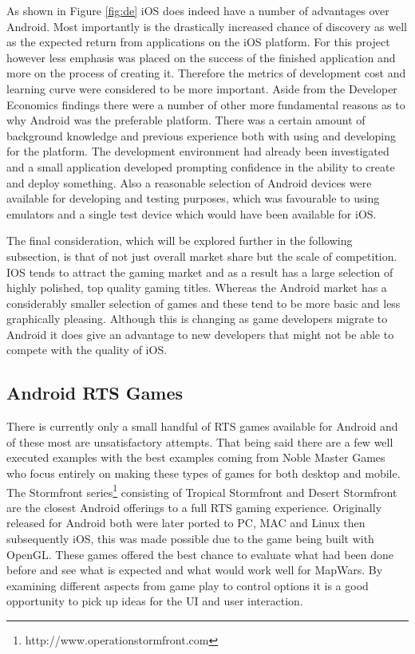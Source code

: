 As shown in Figure \ref{fig:de} iOS does indeed have a number of advantages over Android. Most importantly is the drastically increased chance of discovery as well as the expected return from applications on the iOS platform. For this project however less emphasis was placed on the success of the finished application and more on the process of creating it. Therefore the metrics of development cost and learning curve were considered to be more important. Aside from the Developer Economics findings there were a number of other more fundamental reasons as to why Android was the preferable platform. There was a certain amount of background knowledge and previous experience both with using and developing for the platform. The development environment had already been investigated and a small application developed prompting confidence in the ability to create and deploy something. Also a reasonable selection of Android devices were available for developing and testing purposes, which was favourable to using emulators and a single test device which would have been available for iOS.

The final consideration, which will be explored further in the following subsection, is that of not just overall market share but the scale of competition. IOS tends to attract the gaming market and as a result has a large selection of highly polished, top quality gaming titles. Whereas the Android market has a considerably smaller selection of games and these tend to be more basic and less graphically pleasing. Although this is changing as game developers migrate to Android it does give an advantage to new developers that might not be able to compete with the quality of iOS.


\subsection{Android RTS Games}
There is currently only a small handful of RTS games available for Android and of these most are unsatisfactory attempts. That being said there are a few well executed examples with the best examples coming from Noble Master Games who focus entirely on making these types of games for both desktop and mobile. The Stormfront series\footnote{http://www.operationstormfront.com} consisting of Tropical Stormfront and Desert Stormfront are the closest Android offerings to a full RTS gaming experience. Originally released for Android both were later ported to PC, MAC and Linux then subsequently iOS, this was made possible due to the game being built with OpenGL. These games offered the best chance to evaluate what had been done before and see what is expected and what would work well for MapWars. By examining different aspects from game play to control options it is a good opportunity to pick up ideas for the UI and user interaction.

